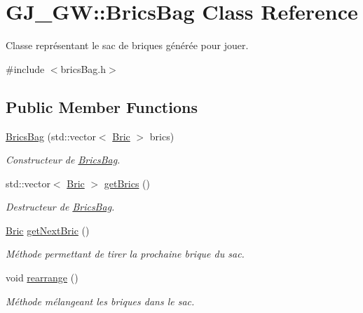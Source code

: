 \hypertarget{class_g_j___g_w_1_1_brics_bag}{}\section{G\+J\+\_\+\+GW\+:\+:Brics\+Bag Class Reference}
\label{class_g_j___g_w_1_1_brics_bag}


Classe représentant le sac de briques générée pour jouer.  




{\ttfamily \#include $<$brics\+Bag.\+h$>$}

\subsection*{Public Member Functions}
\begin{DoxyCompactItemize}
\item 
\hyperlink{class_g_j___g_w_1_1_brics_bag_ac0a01a2cfc202e467bd0a5f5a1143552}{Brics\+Bag} (std\+::vector$<$ \hyperlink{class_g_j___g_w_1_1_bric}{Bric} $>$ brics)
\begin{DoxyCompactList}\small\item\em Constructeur de \hyperlink{class_g_j___g_w_1_1_brics_bag}{Brics\+Bag}. \end{DoxyCompactList}\item 
std\+::vector$<$ \hyperlink{class_g_j___g_w_1_1_bric}{Bric} $>$ \hyperlink{class_g_j___g_w_1_1_brics_bag_aace245eacf3ee57e2969b82409cd377a}{get\+Brics} ()
\begin{DoxyCompactList}\small\item\em Destructeur de \hyperlink{class_g_j___g_w_1_1_brics_bag}{Brics\+Bag}. \end{DoxyCompactList}\item 
\hyperlink{class_g_j___g_w_1_1_bric}{Bric} \hyperlink{class_g_j___g_w_1_1_brics_bag_a0b7de0635ac188c140fc94b7a7632ca8}{get\+Next\+Bric} ()
\begin{DoxyCompactList}\small\item\em Méthode permettant de tirer la prochaine brique du sac. \end{DoxyCompactList}\item 
void \hyperlink{class_g_j___g_w_1_1_brics_bag_a87c0f05f000e3bc415c0dd9ae1e9c7ae}{rearrange} ()\hypertarget{class_g_j___g_w_1_1_brics_bag_a87c0f05f000e3bc415c0dd9ae1e9c7ae}{}\label{class_g_j___g_w_1_1_brics_bag_a87c0f05f000e3bc415c0dd9ae1e9c7ae}

\begin{DoxyCompactList}\small\item\em Méthode mélangeant les briques dans le sac. \end{DoxyCompactList}\end{DoxyCompactItemize}


